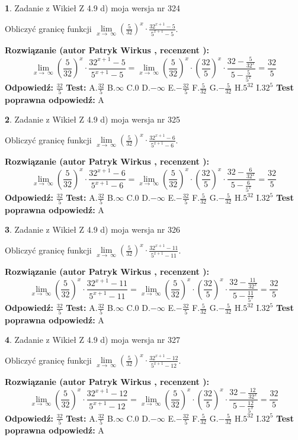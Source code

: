 \documentclass[12pt, a4paper]{article}
\theoremstyle{definition} %
\newtheorem{zad}{}
\newcommand{\zadStart}[1]{\begin{zad}#1\newline}
\newcommand{\zadStop}{\end{zad}}
\newcommand{\rozwStart}[2]{\noindent \textbf{Rozwiązanie (autor #1 , recenzent #2): }\newline}
\newcommand{\rozwStop}{\newline}
\newcommand{\odpStart}{\noindent \textbf{Odpowiedź:}\newline}
\newcommand{\odpStop}{\newline}
\newcommand{\testStart}{\noindent \textbf{Test:}\newline}
\newcommand{\testStop}{\newline}
\newcommand{\kluczStart}{\noindent \textbf{Test poprawna odpowiedź:}\newline}
\newcommand{\kluczStop}{\newline}
\begin{document}
\zadStart{Zadanie z Wikieł Z 4.9 d) moja wersja nr 324}


Obliczyć granicę funkcji  $\lim\limits_{x\to\ \infty}(\frac{5}{32})^{x}\cdot\frac{32^{x+1}-5}{5^{x+1}-5}$.
\zadStop
\rozwStart{Patryk Wirkus}{}
$$\lim\limits_{x\to\ \infty}(\frac{5}{32})^{x}\cdot\frac{32^{x+1}-5}{5^{x+1}-5}=\lim\limits_{x\to\ \infty}(\frac{5}{32})^{x}\cdot(\frac{32}{5})^{x} \cdot \frac{32-\frac{5}{32^{x}}}{5-\frac{5}{5^{x}}} = \frac{32}{5}$$
\rozwStop
\odpStart
$\frac{32}{5}$
\odpStop
\testStart
A.$\frac{32}{5}$ B.$\infty$ C.$0$ D.$-\infty$ E.$-\frac{32}{5}$
F.$\frac{5}{32}$ G.$-\frac{5}{32}$
H.$5^{32}$
I.$32^{5}$
\testStop
\kluczStart
A
\kluczStop



\zadStart{Zadanie z Wikieł Z 4.9 d) moja wersja nr 325}


Obliczyć granicę funkcji  $\lim\limits_{x\to\ \infty}(\frac{5}{32})^{x}\cdot\frac{32^{x+1}-6}{5^{x+1}-6}$.
\zadStop
\rozwStart{Patryk Wirkus}{}
$$\lim\limits_{x\to\ \infty}(\frac{5}{32})^{x}\cdot\frac{32^{x+1}-6}{5^{x+1}-6}=\lim\limits_{x\to\ \infty}(\frac{5}{32})^{x}\cdot(\frac{32}{5})^{x} \cdot \frac{32-\frac{6}{32^{x}}}{5-\frac{6}{5^{x}}} = \frac{32}{5}$$
\rozwStop
\odpStart
$\frac{32}{5}$
\odpStop
\testStart
A.$\frac{32}{5}$ B.$\infty$ C.$0$ D.$-\infty$ E.$-\frac{32}{5}$
F.$\frac{5}{32}$ G.$-\frac{5}{32}$
H.$5^{32}$
I.$32^{5}$
\testStop
\kluczStart
A
\kluczStop



\zadStart{Zadanie z Wikieł Z 4.9 d) moja wersja nr 326}


Obliczyć granicę funkcji  $\lim\limits_{x\to\ \infty}(\frac{5}{32})^{x}\cdot\frac{32^{x+1}-11}{5^{x+1}-11}$.
\zadStop
\rozwStart{Patryk Wirkus}{}
$$\lim\limits_{x\to\ \infty}(\frac{5}{32})^{x}\cdot\frac{32^{x+1}-11}{5^{x+1}-11}=\lim\limits_{x\to\ \infty}(\frac{5}{32})^{x}\cdot(\frac{32}{5})^{x} \cdot \frac{32-\frac{11}{32^{x}}}{5-\frac{11}{5^{x}}} = \frac{32}{5}$$
\rozwStop
\odpStart
$\frac{32}{5}$
\odpStop
\testStart
A.$\frac{32}{5}$ B.$\infty$ C.$0$ D.$-\infty$ E.$-\frac{32}{5}$
F.$\frac{5}{32}$ G.$-\frac{5}{32}$
H.$5^{32}$
I.$32^{5}$
\testStop
\kluczStart
A
\kluczStop



\zadStart{Zadanie z Wikieł Z 4.9 d) moja wersja nr 327}


Obliczyć granicę funkcji  $\lim\limits_{x\to\ \infty}(\frac{5}{32})^{x}\cdot\frac{32^{x+1}-12}{5^{x+1}-12}$.
\zadStop
\rozwStart{Patryk Wirkus}{}
$$\lim\limits_{x\to\ \infty}(\frac{5}{32})^{x}\cdot\frac{32^{x+1}-12}{5^{x+1}-12}=\lim\limits_{x\to\ \infty}(\frac{5}{32})^{x}\cdot(\frac{32}{5})^{x} \cdot \frac{32-\frac{12}{32^{x}}}{5-\frac{12}{5^{x}}} = \frac{32}{5}$$
\rozwStop
\odpStart
$\frac{32}{5}$
\odpStop
\testStart
A.$\frac{32}{5}$ B.$\infty$ C.$0$ D.$-\infty$ E.$-\frac{32}{5}$
F.$\frac{5}{32}$ G.$-\frac{5}{32}$
H.$5^{32}$
I.$32^{5}$
\testStop
\kluczStart
A
\kluczStop
\end{document}

